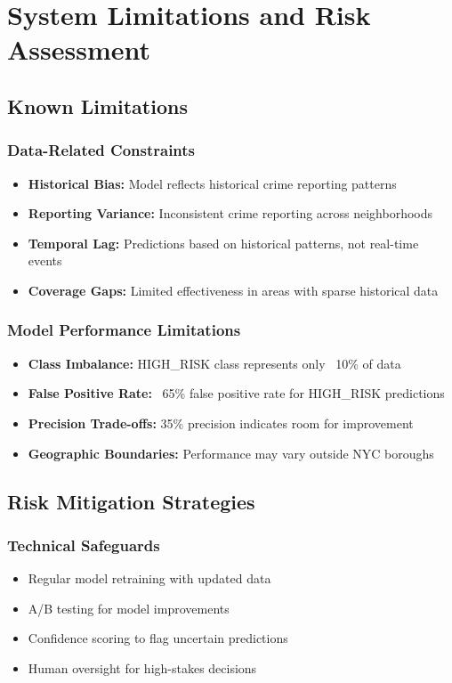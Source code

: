 \documentclass[11pt]{article}
\begin{document}
\section{System Limitations and Risk Assessment}

\subsection{Known Limitations}

\subsubsection{Data-Related Constraints}
\begin{itemize}[leftmargin=*]
\item \textbf{Historical Bias:} Model reflects historical crime reporting patterns
\item \textbf{Reporting Variance:} Inconsistent crime reporting across neighborhoods
\item \textbf{Temporal Lag:} Predictions based on historical patterns, not real-time events
\item \textbf{Coverage Gaps:} Limited effectiveness in areas with sparse historical data
\end{itemize}

\subsubsection{Model Performance Limitations}
\begin{itemize}[leftmargin=*]
\item \textbf{Class Imbalance:} HIGH\_RISK class represents only ~10\% of data
\item \textbf{False Positive Rate:} ~65\% false positive rate for HIGH\_RISK predictions
\item \textbf{Precision Trade-offs:} 35\% precision indicates room for improvement
\item \textbf{Geographic Boundaries:} Performance may vary outside NYC boroughs
\end{itemize}

\subsection{Risk Mitigation Strategies}

\subsubsection{Technical Safeguards}
\begin{itemize}[leftmargin=*]
\item Regular model retraining with updated data
\item A/B testing for model improvements
\item Confidence scoring to flag uncertain predictions
\item Human oversight for high-stakes decisions
\end{itemize}
\end{document}

